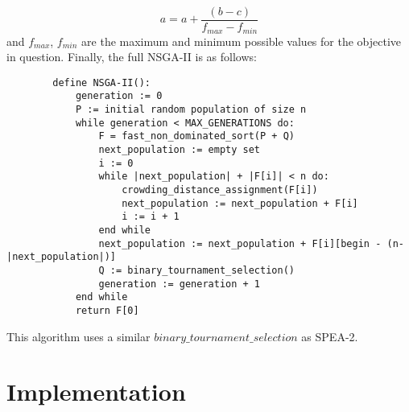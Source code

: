 \documentclass{article}
\begin{document}
    \begin{equation*}
        a = a + \dfrac{(b - c)}{f_{max} - f_{min}}
    \end{equation*}
    and \(f_{max}\), \(f_{min}\) are the maximum and minimum possible values for the objective in question. 
    Finally, the full NSGA-II is as follows:
    \begin{lstlisting}
        define NSGA-II():
            generation := 0
            P := initial random population of size n
            while generation < MAX_GENERATIONS do:
                F = fast_non_dominated_sort(P + Q)
                next_population := empty set
                i := 0
                while |next_population| + |F[i]| < n do:
                    crowding_distance_assignment(F[i])
                    next_population := next_population + F[i]
                    i := i + 1
                end while
                next_population := next_population + F[i][begin - (n-|next_population|)]
                Q := binary_tournament_selection()
                generation := generation + 1
            end while
            return F[0]
    \end{lstlisting}
    This algorithm uses a similar \(binary\_tournament\_selection\) as SPEA-2.
    \cite{DebPratapAgarwalMeyarivan} \cite{PonsichJaimesCoello}
    \section{Implementation}
\end{document}
